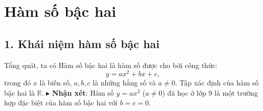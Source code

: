 \documentclass[12pt,a4paper]{extarticle}
\begin{document}
\makeheadbox[headerright={Tổng ôn 10-11},chude={CHỦ ĐỀ 04},tieude={Tam thức bậc hai},dinhdang={Đại số},lop={12 },gv={Nguyễn Lê Minh Ngọc}]

\vspace{2em}
\section{Hàm số bậc hai}
\subsection*{1. Khái niệm hàm số bậc hai}
Tổng quát, ta có Hàm số bậc hai là hàm số được cho bởi công thức:
\[ y = ax^2 + bx + c, \]
trong đó $x$ là biến số, $a, b, c$ là những hằng số và $a \neq 0$.
Tập xác định của hàm số bậc hai là $\mathbb{R}$.
\noindent $\blacktriangleright$ \textbf{Nhận xét}: Hàm số $y = ax^2$ ($a \neq 0$) đã học ở lớp 9 là một trường hợp đặc biệt của hàm số bậc hai với $b = c = 0$.
\end{document}
